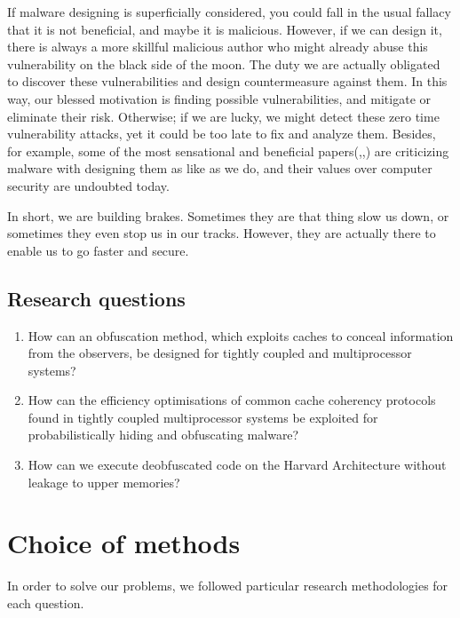 If malware designing is superficially considered, you could fall in the usual fallacy that it is not beneficial, and maybe it is malicious. However, if we can design it, there is always a more skillful malicious author who might already abuse this vulnerability on the black side of the moon. The duty we are actually obligated to discover these vulnerabilities and design countermeasure against them. In this way, our blessed motivation is finding possible vulnerabilities, and mitigate or eliminate their risk. Otherwise; if we are lucky, we might detect these zero time vulnerability attacks, yet it could be too late to fix and analyze them. Besides, for example, some of the most sensational and beneficial papers(\cite{moser2007limits},\cite{cavallaro2008limits},\cite{egele2012survey}) are criticizing malware with designing them as like as we do, and their values over computer security are undoubted today. 

In short, we are building brakes. Sometimes they are that thing slow us down, or sometimes they even stop us in our tracks. However, they are actually there to enable us to go faster and secure.

\subsection{Research questions}\label{research:questions}
\begin{enumerate}
	\item How can an obfuscation method, which exploits caches to conceal information from the observers, be designed for tightly coupled and multiprocessor systems?
	\item How can the efficiency optimisations of common cache coherency protocols found in tightly coupled multiprocessor systems be exploited for probabilistically hiding and obfuscating malware?
	\item How can we execute deobfuscated code on the Harvard Architecture without leakage to upper memories?
\end{enumerate}


\section{Choice of methods}

	In order to solve our problems, we followed particular research methodologies for each question.

